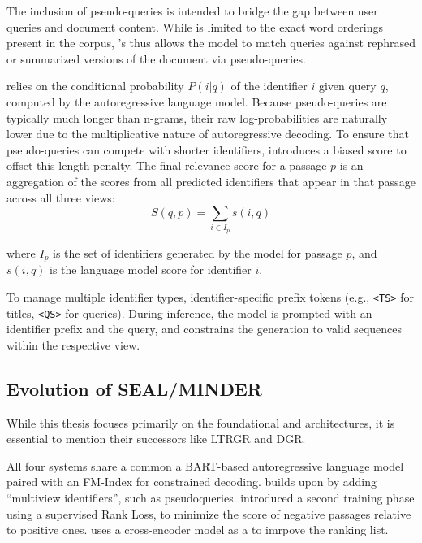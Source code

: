 The inclusion of pseudo-queries is intended to bridge the gap between user queries and document content. While  is limited to the exact word orderings present in the corpus, 's thus allows the model to match queries against rephrased or summarized versions of the document via pseudo-queries.

 relies on the conditional probability $P(i\allowbreak|q)$ of the identifier $i$ given query $q$, computed by the autoregressive language model. Because pseudo-queries are typically much longer than n-grams, their raw log-probabilities are naturally lower due to the multiplicative nature of autoregressive decoding. To ensure that pseudo-queries can compete with shorter identifiers,  introduces a biased score to offset this length penalty. The final relevance score for a passage $p$ is an aggregation of the scores from all predicted identifiers that appear in that passage across all three views:
\begin{equation}
   S(q, p) = \sum_{i \in I_p} s(i, q)
   \label{eq:minder-aggregation}
\end{equation}

where $I_p$ is the set of identifiers generated by the model for passage $p$, and $s(i, q)$ is the language model score for identifier $i$.

To manage multiple identifier types,  identifier-specific prefix tokens (e.g., \texttt{<TS>} for titles, \texttt{<QS>} for queries). During inference, the model is prompted with an identifier prefix and the query, and constrains the generation to valid sequences within the respective view.

\subsection{Evolution of SEAL/MINDER}

While this thesis focuses primarily on the foundational  and  architectures, it is essential to mention their successors like LTRGR and DGR.

All four systems share a common a BART-based autoregressive language model paired with an FM-Index for constrained decoding.  builds upon  by adding ``multiview identifiers'', such as pseudoqueries.  introduced a second training phase using a supervised Rank Loss, to minimize the score of negative passages relative to positive ones.  uses a cross-encoder model as a to imrpove the ranking list.

